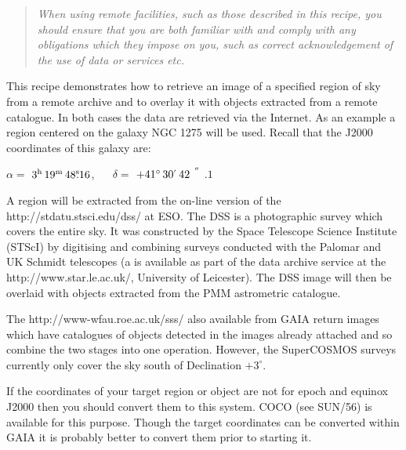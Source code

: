 \documentclass[twoside,11pt]{starlink}
\providecommand{\arcsec} {$\hspace{-0.05em}\raisebox{-0.5ex}
                     {$^{'\hspace{-0.1em}'}$}
                     \hspace{-0.7em}.\hspace{-0.05em}$}
\providecommand{\tsec}   {\mbox{$^{\rm s}\!\!.$}}
\providecommand{\hms}[4] {$#1^{\rm h}\,#2^{\rm m}\,#3\tsec#4$}
\providecommand{\dms}[4] {$#1^{\circ}\,#2\raisebox{-0.5ex}{$^{'}$}\,#3\arcsec#4$}
\begin{document}
\begin{quote}
\textit{When using remote facilities, such as those described in this
recipe, you should ensure that you are both familiar with and comply
with any obligations which they impose on you, such as correct
acknowledgement of the use of data or services \emph{etc}.}
\end{quote}

This recipe demonstrates how to retrieve an image of a specified region
of sky from a remote archive and to overlay it with objects extracted from
a remote catalogue.  In both cases the data are retrieved via the Internet.
As an example a region centered on the galaxy NGC 1275 will be used.
Recall that the J2000 coordinates of this galaxy are:

\begin{center}
$\alpha =$ \hms{3}{19}{48}{16}, ~~ $\delta =$ \dms{+41}{30}{42}{1}
\end{center}

A region will be extracted from the on-line version of the
{http://stdatu.stsci.edu/dss/}
at ESO.  The DSS is a photographic survey which covers the
entire sky.  It was constructed by the Space Telescope Science Institute
(STScI) by digitising and combining surveys conducted with the Palomar
and UK Schmidt telescopes (a
is available as part of the
data archive service at the
{http://www.star.le.ac.uk/}, University of Leicester).  The DSS image will
then be overlaid with objects extracted from the
 PMM astrometric
catalogue\cite{PMM}.

The 
{http://www-wfau.roe.ac.uk/sss/} also available from GAIA return images
which have catalogues of objects detected in the images already attached
and so combine the two stages into one operation.  However, the SuperCOSMOS
surveys currently only cover the sky south of Declination $+3^{\circ}$.

If the coordinates of your target region or object are not for epoch and
equinox J2000 then you should convert them to this system.  COCO (see
SUN/56\cite{SUN56}) is available for this purpose.  Though the target
coordinates can be converted within GAIA it is probably better to convert
them prior to starting it.
\end{document}
